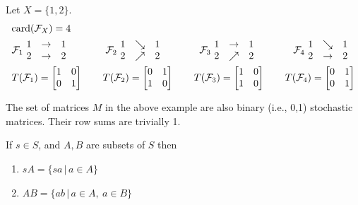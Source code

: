 Let $X = \{1,2\}$.
\[
\begin{aligned}
     &\hbox{card}(\mathcal{F}_X) = 4                       \\
     &\mathcal{F}_1 \ \begin{matrix}
             1 &\rightarrow &1 \\
             2 &\rightarrow &2
             \end{matrix} \qquad \qquad
      \mathcal{F}_2 \ \begin{matrix}
             1 &\searrow &1 \\
             2 &\nearrow &2
             \end{matrix} \qquad \qquad
      \mathcal{F}_3 \ \begin{matrix}
             1 &\rightarrow &1 \\
             2 &\nearrow    &2
             \end{matrix} \qquad \qquad
      \mathcal{F}_4 \ \begin{matrix}
             1 &\searrow    &1 \\
             2 &\rightarrow &2
             \end{matrix}                           \\
     &T(\mathcal{F}_1) = \begin{bmatrix}
                1  &0  \\  0  &1  \end{bmatrix} \qquad
      T(\mathcal{F}_2) = \begin{bmatrix}
                0  &1  \\  1  &0  \end{bmatrix} \qquad
      T(\mathcal{F}_3) = \begin{bmatrix}
                1  &0  \\  1  &0  \end{bmatrix} \qquad
      T(\mathcal{F}_4) = \begin{bmatrix}
                0  &1  \\  0  &1  \end{bmatrix}
     \end{aligned}
\]

  The set of matrices $M$ in the above example are also binary (i.e., 0,1) stochastic matrices.  
Their row sums are trivially 1.

If $s \in S$, and $A,B$ are subsets of $S$ then
\begin{enumerate}
\item[(1)] $sA = \{sa \,|\, a \in A \}$
\item[(2)] $AB = \{ab \,|\, a \in A, \ a \in B\}$
\end{enumerate}

